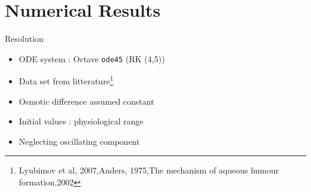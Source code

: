 \section{Numerical Results}
\frame{\sectionpage}
\begin{frame}{Resolution}
\begin{itemize}
\item ODE system : Octave \texttt{ode45} (RK (4,5))
\item Data set from litterature\footnote{Lyubimov et al, 2007,Anders, 1975,The mechanism of aqueous humour formation,2002}
\item Osmotic difference assumed constant
\item Initial values : physiological range
\item Neglecting oscillating component
\end{itemize}

\end{frame}
\begin{frame}

\end{frame}
